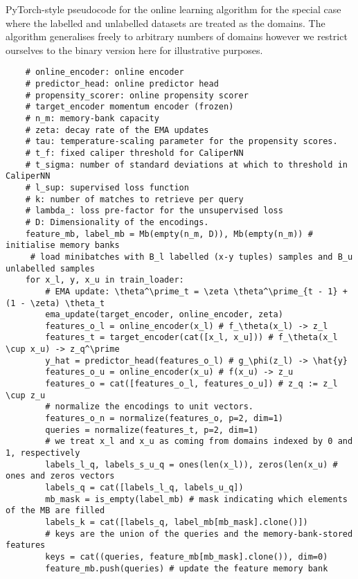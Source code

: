 \begin{algorithm}[ht]
     \caption{
         PyTorch-style pseudocode for the online learning algorithm for the special case where the
         labelled and unlabelled datasets are treated as the domains. The algorithm generalises
         freely to arbitrary numbers of domains however we restrict ourselves to the binary version
         here for illustrative purposes.
    }
    \label{alg:ol_pc}
    \begin{verbatim}
    # online_encoder: online encoder
    # predictor_head: online predictor head
    # propensity_scorer: online propensity scorer
    # target_encoder momentum encoder (frozen)
    # n_m: memory-bank capacity
    # zeta: decay rate of the EMA updates
    # tau: temperature-scaling parameter for the propensity scores.
    # t_f: fixed caliper threshold for CaliperNN
    # t_sigma: number of standard deviations at which to threshold in CaliperNN
    # l_sup: supervised loss function
    # k: number of matches to retrieve per query
    # lambda_: loss pre-factor for the unsupervised loss
    # D: Dimensionality of the encodings.
    feature_mb, label_mb = Mb(empty(n_m, D)), Mb(empty(n_m)) # initialise memory banks
     # load minibatches with B_l labelled (x-y tuples) samples and B_u unlabelled samples
    for x_l, y, x_u in train_loader:
        # EMA update: \theta^\prime_t = \zeta \theta^\prime_{t - 1} + (1 - \zeta) \theta_t
        ema_update(target_encoder, online_encoder, zeta)
        features_o_l = online_encoder(x_l) # f_\theta(x_l) -> z_l
        features_t = target_encoder(cat([x_l, x_u])) # f_\theta(x_l \cup x_u) -> z_q^\prime
        y_hat = predictor_head(features_o_l) # g_\phi(z_l) -> \hat{y}
        features_o_u = online_encoder(x_u) # f(x_u) -> z_u
        features_o = cat([features_o_l, features_o_u]) # z_q := z_l \cup z_u
        # normalize the encodings to unit vectors.
        features_o_n = normalize(features_o, p=2, dim=1)
        queries = normalize(features_t, p=2, dim=1)
        # we treat x_l and x_u as coming from domains indexed by 0 and 1, respectively
        labels_l_q, labels_s_u_q = ones(len(x_l)), zeros(len(x_u) # ones and zeros vectors
        labels_q = cat([labels_l_q, labels_u_q])
        mb_mask = is_empty(label_mb) # mask indicating which elements of the MB are filled
        labels_k = cat([labels_q, label_mb[mb_mask].clone()])
        # keys are the union of the queries and the memory-bank-stored features
        keys = cat((queries, feature_mb[mb_mask].clone()), dim=0)
        feature_mb.push(queries) # update the feature memory bank

\end{verbatim}
\end{algorithm}
